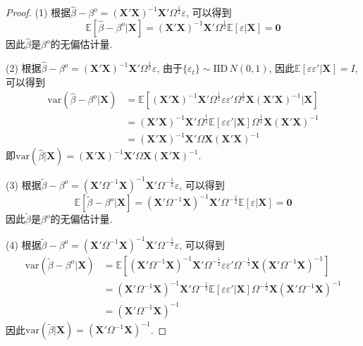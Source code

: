 \documentclass[cn,12pt,math=mtpro2,citestyle=gb7714-2015,bibstyle=gb7714-2015,twocol,mode=simple]{elegantbook}
\newcommand{\E}{\mathbb{E}}
\newcommand{\var}{\text{var}}
\newcommand{\hbeta}{\hat{\beta}}
\newcommand{\tbeta}{\tilde{\beta}}
\begin{document}
\begin{proof}
  (1) 根据$\hbeta-\beta^o=(\mathbf{X}'\mathbf{X})^{-1}\mathbf{X}'\Omega^{\frac{1}{2}}\varepsilon$, 可以得到
  $$\E[\hbeta-\beta^o|\mathbf{X}]=(\mathbf{X}'\mathbf{X})^{-1}\mathbf{X}'\Omega^{\frac{1}{2}}\E[\varepsilon|\mathbf{X}]=\mathbf{0} $$
  因此$\hbeta$是$\beta^o$的无偏估计量.

 (2) 根据$\hbeta-\beta^o=(\mathbf{X}'\mathbf{X})^{-1}\mathbf{X}'\Omega^{\frac{1}{2}}\varepsilon$, 由于$\{\varepsilon_t\}\sim \text{IID}\,N(0,1)$, 因此$\E[\varepsilon\varepsilon'|\mathbf{X}]=I$, 可以得到
 \begin{align*}
 \var(\hbeta-\beta^o|\mathbf{X})&=\E[(\mathbf{X}'\mathbf{X})^{-1}\mathbf{X}'\Omega^{\frac{1}{2}}\varepsilon\varepsilon'\Omega^{\frac{1}{2}}\mathbf{X}(\mathbf{X}'\mathbf{X})^{-1}|\mathbf{X}] \\
 &=(\mathbf{X}'\mathbf{X})^{-1}\mathbf{X}'\Omega^{\frac{1}{2}}\E[\varepsilon\varepsilon'|\mathbf{X}]\Omega^{\frac{1}{2}}\mathbf{X}(\mathbf{X}'\mathbf{X})^{-1} \\
 &=(\mathbf{X}'\mathbf{X})^{-1}\mathbf{X}'\Omega \mathbf{X}(\mathbf{X}'\mathbf{X})^{-1}
 \end{align*}
 即$\var(\hbeta|\mathbf{X})=(\mathbf{X}'\mathbf{X})^{-1}\mathbf{X}'\Omega \mathbf{X}(\mathbf{X}'\mathbf{X})^{-1}$.

 (3) 根据$\tbeta-\beta^o=(\mathbf{X}'\Omega^{-1}\mathbf{X})^{-1}\mathbf{X}'\Omega^{-\frac{1}{2}}\varepsilon$, 可以得到
  $$\E[\tbeta-\beta^o|\mathbf{X}]=(\mathbf{X}'\Omega^{-1}\mathbf{X})^{-1}\mathbf{X}'\Omega^{-\frac{1}{2}}\E[\varepsilon|\mathbf{X}]=\mathbf{0}$$
  因此$\tbeta$是$\beta^o$的无偏估计量.

  (4) 根据$\tbeta-\beta^o=(\mathbf{X}'\Omega^{-1}\mathbf{X})^{-1}\mathbf{X}'\Omega^{-\frac{1}{2}}\varepsilon$, 可以得到
  \begin{align*}
  \var(\tbeta-\beta^o|\mathbf{X})&=\E[(\mathbf{X}'\Omega^{-1}\mathbf{X})^{-1}\mathbf{X}'\Omega^{-\frac{1}{2}}\varepsilon\varepsilon'\Omega^{-\frac{1}{2}}\mathbf{X}(\mathbf{X}'\Omega^{-1}\mathbf{X})^{-1}] \\
  &=(\mathbf{X}'\Omega^{-1}\mathbf{X})^{-1}\mathbf{X}'\Omega^{-\frac{1}{2}}\E[\varepsilon\varepsilon'|\mathbf{X}]\Omega^{-\frac{1}{2}}\mathbf{X}(\mathbf{X}'\Omega^{-1}\mathbf{X})^{-1} \\
  &=(\mathbf{X}'\Omega^{-1}\mathbf{X})^{-1}
  \end{align*}
  因此$\var(\tbeta|\mathbf{X})=(\mathbf{X}'\Omega^{-1}\mathbf{X})^{-1}$.


\end{proof}
\end{document}
